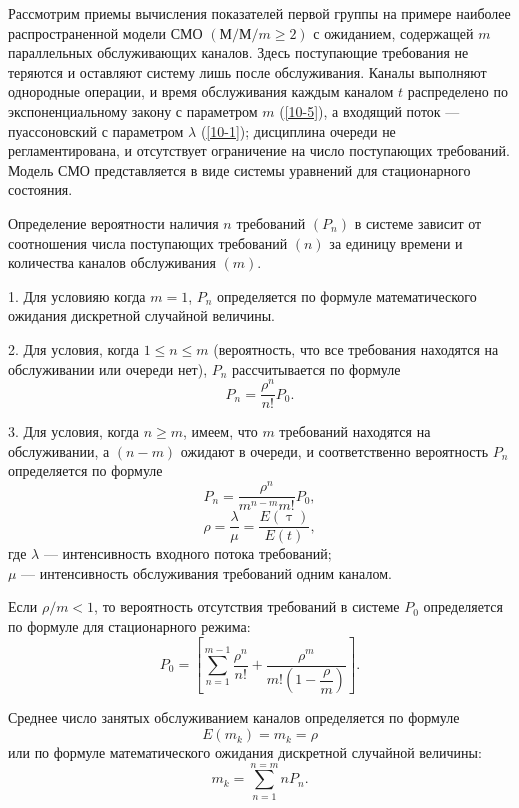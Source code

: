 Рассмотрим приемы вычисления показателей первой группы на примере наиболее распространенной модели СМО $(М/М/m \geq 2)$ с ожиданием, содержащей $m$ параллельных обслуживающих каналов. Здесь поступающие требования не теряются и оставляют систему лишь после обслуживания. Каналы выполняют однородные операции, и время обслуживания каждым каналом $t$ распределено по экспоненциальному закону с параметром $m$ (\ref{10-5}), а входящий поток — пуассоновский с параметром $\lambda$ (\ref{10-1}); дисциплина очереди не регламентирована, и отсутствует ограничение на число поступающих требований. Модель СМО представляется в виде системы уравнений для стационарного состояния.

Определение вероятности наличия $n$ требований $(P_n)$ в системе зависит от соотношения числа поступающих требований $(n)$  за единицу времени  и количества каналов обслуживания $(m)$.

1. Для условияю когда $ m =1 $, $P_n  $ определяется по формуле математического ожидания дискретной случайной величины.

2. Для условия, когда $ 1\leq n \leq m $ (вероятность, что все требования находятся на обслуживании или очереди нет), $ P_n $ рассчитывается по формуле
\begin{equation}\label{10-8}
P_n = \dfrac{\rho^n}{n!}P_0.
\end{equation}

3. Для условия, когда $n \geq m  $, имеем, что $  m$ требований находятся на обслуживании, а $  (n - m )$ ожидают в очереди, и соответственно вероятность $  P_n$ определяется по формуле
\begin{equation}\label{10-9}
P_n = \dfrac{\rho^n}{m^{n-m}m!}P_0,
\end{equation}
\begin{equation}\label{10-10}
\rho = \dfrac{\lambda}{\mu} = \dfrac{E(\uptau)}{E(t)},
\end{equation}
где $ \lambda $ --- интенсивность входного потока требований;\\
$ \mu $ --- интенсивность обслуживания требований одним каналом.

Если $ \rho / m < 1 $, то вероятность отсутствия требований в системе $ P_0  $ определяется по формуле для стационарного режима:
\begin{equation}\label{10-11}
P_0 = \left[\sum\limits_{n=1}^{m-1}\dfrac{\rho^n}{n!} + \dfrac{\rho^m}{m!\left(1-\dfrac{\rho}{m}\right)}\right].
\end{equation}

Среднее число занятых обслуживанием каналов определяется по формуле
\begin{equation}\label{10-12}
E(m_k) = m_k = \rho
\end{equation}
или по формуле математического ожидания дискретной случайной величины:
\begin{equation}\label{10-13}
m_k = \sum\limits_{n=1}^{n=m} nP_n.
\end{equation}

